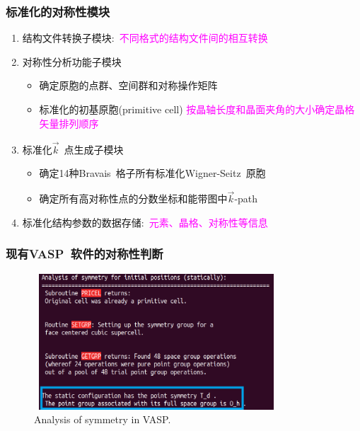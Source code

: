 \documentclass[cjk,slidestop,handout,compress,mathserif,blue]{beamer}	%
\newcommand{\upcite}[1]{\hspace{0ex}\textsuperscript{\cite{#1}}} %
\begin{document}
\frame
{
	\frametitle{标准化的对称性模块}
\begin{enumerate}
   \setlength{\itemsep}{20pt}
	\item 结构文件转换子模块:~\textcolor{magenta}{不同格式的结构文件间的相互转换}
	\item 对称性分析功能子模块
		\begin{itemize}
			\item 确定原胞的点群、空间群和对称操作矩阵
			\item 标准化的初基原胞(\textrm{primitive cell})
				\vskip 2pt
				\textcolor{magenta}{按晶轴长度和晶面夹角的大小确定晶格矢量排列顺序}
		\end{itemize}
	\item 标准化$\vec k$~点生成子模块\upcite{CMS49-299_2010}
		\begin{itemize}
			\item 确定14种\textrm{Bravais~}格子所有标准化\textrm{Wigner-Seitz~}原胞
			\item 确定所有高对称性点的分数坐标和能带图中$\vec k$-\textrm{path}
		\end{itemize}
	\item 标准化结构参数的数据存储:~\textcolor{magenta}{元素、晶格、对称性等信息}
\end{enumerate}
}

\frame
{
	\frametitle{现有\textrm{VASP~}软件的对称性判断}
\begin{figure}[h!]
\centering
\hspace*{-0.28in}
\includegraphics[height=2.0in,width=3.6in,viewport=0 0 600 380,clip]{Figures/VASP_Symmetry.png}
\caption{\textrm{Analysis of symmetry in VASP.}}
\label{VASP_symmetry}
\end{figure}
}
\end{document}
